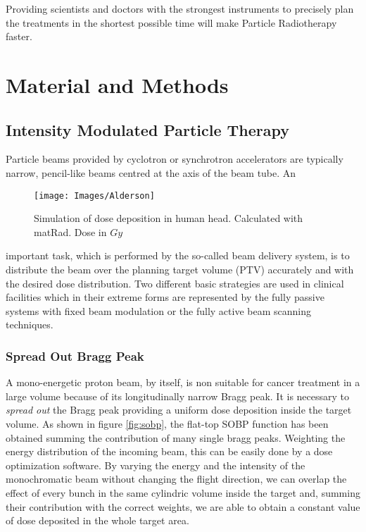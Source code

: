 \documentclass[12pt, a4paper, twoside]{book}
\begin{document}
Providing scientists and doctors with the strongest instruments to precisely plan the treatments in the shortest possible time will make Particle Radiotherapy faster.









\chapter{Material and Methods} \label{MatMeth}%

\section{Intensity Modulated Particle Therapy}

Particle beams provided by cyclotron or synchrotron accelerators are typically narrow, pencil-like beams centred at the axis of the beam tube. An 
\begin{wrapfigure}{l}{.5\textwidth}
{\texttt{[image: Images/Alderson]}}
\caption{Simulation of dose deposition in human head. Calculated with matRad. Dose in $Gy$}
\label{fig:alderson}
\vspace{-10mm}
\end{wrapfigure}
\noindent important task, which is performed by the so-called beam delivery system, is to distribute the beam over the planning target volume (PTV) accurately and with the desired dose distribution.
Two different basic strategies are used in clinical facilities which in their extreme forms are represented by the fully passive systems with fixed beam modulation or the fully active beam scanning techniques.

\subsection{Spread Out Bragg Peak}
\label{sec:sobp}

A mono-energetic proton beam, by itself, is non suitable for cancer treatment in a large volume because of its longitudinally narrow Bragg peak. 
It is necessary to \emph{spread out} the Bragg peak providing a uniform dose deposition inside the target volume. As shown in figure  \ref{fig:sobp}, the flat-top SOBP function has been obtained summing the contribution of many single bragg peaks. Weighting the energy distribution of the incoming beam, this can be easily done by a dose optimization software.
By varying the energy and the intensity of the monochromatic beam without changing the flight direction, we can overlap the effect of every bunch in the same cylindric volume inside the target and, summing their contribution with the correct weights, we are able to obtain a constant value of dose deposited in the whole target area.
\end{document}
